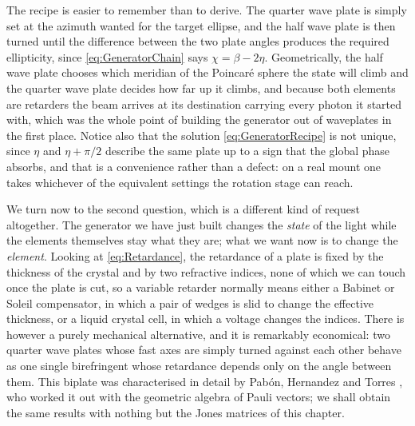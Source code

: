             The recipe is easier to remember than to derive. The quarter wave plate is simply set at the azimuth wanted for the target ellipse, and the half wave plate is then turned until the difference between the two plate angles produces the required ellipticity, since \ref{eq:GeneratorChain} says $\chi=\beta-2\eta$. Geometrically, the half wave plate chooses which meridian of the Poincaré sphere the state will climb and the quarter wave plate decides how far up it climbs, and because both elements are retarders the beam arrives at its destination carrying every photon it started with, which was the whole point of building the generator out of waveplates in the first place. Notice also that the solution \ref{eq:GeneratorRecipe} is not unique, since $\eta$ and $\eta+\pi/2$ describe the same plate up to a sign that the global phase absorbs, and that is a convenience rather than a defect: on a real mount one takes whichever of the equivalent settings the rotation stage can reach.

            We turn now to the second question, which is a different kind of request altogether. The generator we have just built changes the \textit{state} of the light while the elements themselves stay what they are; what we want now is to change the \textit{element}. Looking at \ref{eq:Retardance}, the retardance of a plate is fixed by the thickness of the crystal and by two refractive indices, none of which we can touch once the plate is cut, so a variable retarder normally means either a Babinet or Soleil compensator, in which a pair of wedges is slid to change the effective thickness, or a liquid crystal cell, in which a voltage changes the indices. There is however a purely mechanical alternative, and it is remarkably economical: two quarter wave plates whose fast axes are simply turned against each other behave as one single birefringent whose retardance depends only on the angle between them. This biplate was characterised in detail by Pabón, Hernandez and Torres \citep{pabon2023tunable}, who worked it out with the geometric algebra of Pauli vectors; we shall obtain the same results with nothing but the Jones matrices of this chapter.

